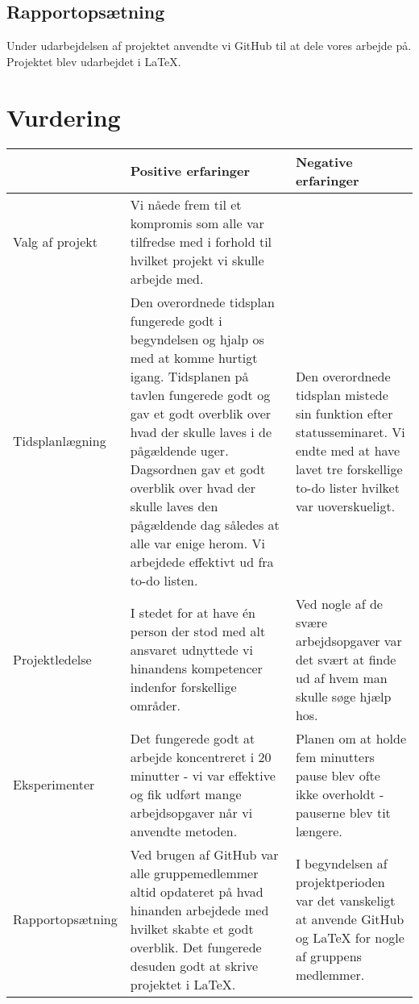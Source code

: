 \subsection{Rapportopsætning}
Under udarbejdelsen af projektet anvendte vi GitHub til at dele vores arbejde på. Projektet blev udarbejdet i LaTeX. 

\section{Vurdering}



\begin{table}[H]
	\begin{tabular}{|l|l|l|}
		\hline
		&\textbf{Positive erfaringer}&\textbf{Negative erfaringer}\\ \hline
		Valg af projekt  & Vi nåede frem til et kompromis som alle var tilfredse med i forhold til hvilket projekt vi skulle arbejde med. & \\ \hline  
		Tidsplanlægning  & Den overordnede tidsplan fungerede godt i begyndelsen og hjalp os med at komme hurtigt igang. Tidsplanen på tavlen fungerede godt og gav et godt overblik over hvad der skulle laves i de pågældende uger. Dagsordnen gav et godt overblik over hvad der skulle laves den pågældende dag således at alle var enige herom. Vi arbejdede effektivt ud fra to-do listen. & Den overordnede tidsplan mistede sin funktion efter statusseminaret. Vi endte med at have lavet tre forskellige to-do lister hvilket var uoverskueligt. \\ \hline
		Projektledelse   & I stedet for at have én person der stod med alt ansvaret udnyttede vi hinandens kompetencer indenfor forskellige områder. & Ved nogle af de svære arbejdsopgaver var det svært at finde ud af hvem man skulle søge hjælp hos. \\ \hline
		Eksperimenter    & Det fungerede godt at arbejde koncentreret i 20 minutter - vi var effektive og fik udført mange arbejdsopgaver når vi anvendte metoden. & Planen om at holde fem minutters pause blev ofte ikke overholdt - pauserne blev tit længere. \\ \hline
		Rapportopsætning & Ved brugen af GitHub var alle gruppemedlemmer altid opdateret på hvad hinanden arbejdede med hvilket skabte et godt overblik. Det fungerede desuden godt at skrive projektet i LaTeX. & I begyndelsen af projektperioden var det vanskeligt at anvende GitHub og LaTeX for nogle af gruppens medlemmer. \hline
     
	\end{tabular}
\end{table}


